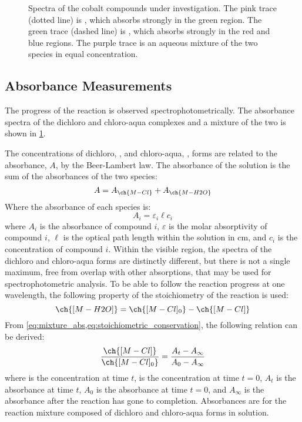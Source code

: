 \begin{figure}[htb]
	
	\caption{Spectra of the cobalt compounds under investigation. The pink trace (dotted line) is , which absorbs strongly in the green region. The green trace (dashed line) is , which absorbs strongly in the red and blue regions. The purple trace is an aqueous mixture of the two species in equal concentration.}
	\label{fig:co_spectra}
\end{figure}	

\subsection{Absorbance Measurements}
\label{subs:absorbance_measurements}

The progress of the reaction is observed spectrophotometrically. The absorbance spectra of the dichloro and chloro-aqua complexes and a mixture of the two is shown in \cref{fig:co_spectra}. 

The concentrations of dichloro, \ch{[M-Cl]}, and chloro-aqua, \ch{[M-H2O]}, forms are related to the absorbance, \(A\), by the Beer-Lambert law. The absorbance of the solution is the sum of the absorbances of the two species: 
\begin{equation}
	A = A_{\ch{M-Cl}} + A_{\ch{M-H2O}}
	\label{eq:mixture_abs}
\end{equation}
Where the absorbance of each species is:
\begin{equation}
	A_{i} = \varepsilon_{i} \ell c_{i}
	\label{eq:beer-lambert_law}
\end{equation}
where \(A_{i}\) is the absorbance of compound \(i\), \(\varepsilon\) is the molar absorptivity of compound \(i\), \(\ell\) is the optical path length within the solution in \unit{\cm},  and \(c_{i}\) is the concentration of compound \(i\). 
Within the visible region, the spectra of the dichloro and chloro-aqua forms are distinctly different, but there is not a single maximum, free from overlap with other absorptions, that may be used for spectrophotometric analysis. 
To be able to follow the reaction progress at one wavelength, the following property of the stoichiometry of the reaction is used:
\begin{equation}
	\ch{[M-H2O]} = \ch{[M-Cl]_0} - \ch{[M-Cl]}
	\label{eq:stoichiometric_conservation}
\end{equation}
From \cref{eq:mixture_abs,eq:stoichiometric_conservation}, the following relation can be derived:
\begin{equation}
	\frac{\ch{[M-Cl]}}{\ch{[M-Cl]_0}} = \frac{A_t - A_\infty}{A_0 - A_\infty}
	\label{eq:conversion_fraction}
\end{equation}
where \ch{[M-Cl]} is the concentration at time \(t\),  is the concentration at time \(t=0\), \(A_t\) is the absorbance at time \(t\), \(A_0\) is the absorbance at time \(t=0\), and \(A_\infty\) is the absorbance after the reaction has gone to completion. 
Absorbances are for the reaction mixture composed of dichloro and chloro-aqua forms in solution. 

